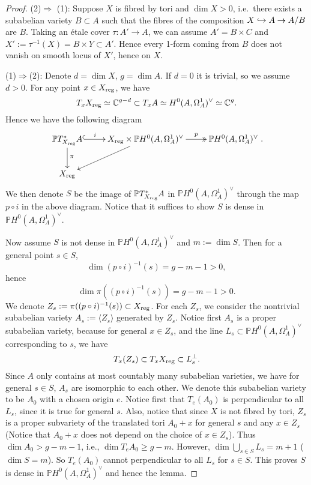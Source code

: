 \documentclass[a4paper,12pt,reqno]{amsart}
\theoremstyle{plain}
\theoremstyle{remark}
\newcommand{\C}{\mathbb C}
\renewcommand{\cong}{\simeq}
\newcommand{\into}{\hookrightarrow}
\newcommand{\onto}{\rightarrow\hspace*{-.14in}\rightarrow}
\begin{document}
\begin{proof}\label{proof:van-nonsimple} (2)$\Rightarrow$ (1): Suppose $X$ is fibred by tori and $\dim X>0$, i.e.\ there exists a subabelian variety $B\subset A$ such that the fibres of the composition 
$X\into A \onto A/B$ are $B$. Taking an \'etale cover $\tau: A'\to A$, we can assume $A'=B\times C$ and $X':=\tau^{-1}(X)=B\times Y\subset A'$. Hence every 1-form coming from $B$ does not vanish on smooth locus of $X'$, hence on $X$. 

(1)$\Rightarrow$(2): Denote $d=\dim X$, $g=\dim A$. If $d=0$ it is trivial, so we assume $d>0$. For any point $x\in X_{\textnormal{reg}}$, we have $$T_xX_{\textnormal{reg}}\cong \C^{g-d}\subset T_xA\cong H^0(A, \Omega_A^1)^{\vee}\cong \C^g.$$
Hence we have the following diagram 
$$\xymatrix{
\mathbb{P}T^*_{X_{\textnormal{reg}}}A \ar[d]^{\pi} \ar@{^{(}->}[r]^-i
&X_{\textnormal{reg}}\times \mathbb{P}H^0(A, \Omega_A^1)^{\vee}\ar[dl] \ar@{->>}[r]^-p&\mathbb{P}H^0(A, \Omega_A^1)^{\vee} \\
X_{\textnormal{reg}}
}.$$
We then denote $S$ be the image of $\mathbb{P}T^*_{X_{\textnormal{reg}}}A$ in $\mathbb{P}H^0(A, \Omega_A^1)^{\vee}$ through the map $p\circ i$ in the above diagram. Notice that it suffices to show $S$ is dense in $\mathbb{P}H^0(A, \Omega_A^1)^{\vee}$. 

Now assume $S$ is not dense in $\mathbb{P}H^0(A, \Omega_A^1)^{\vee}$ and $m:=\dim S$. Then for a general point $s\in S$, $$\dim (p\circ i)^{-1}(s)=g-m-1>0,$$ hence $$\dim \pi((p\circ i)^{-1}(s))=g-m-1>0.$$ We denote $Z_s:= \pi((p\circ i)^{-1}(s))\subset X_{\textnormal{reg}}$. For each $Z_s$, we consider the nontrivial subabelian variety $A_s:=\langle Z_s \rangle$ generated by $Z_s$.  Notice first $A_s$ is a proper subabelian variety, because for general $x\in Z_s$, and the line $L_s\subset \mathbb{P}H^0(A, \Omega_A^1)^{\vee}$ corresponding to $s$, we have $$T_x(Z_s)\subset T_xX_{\textnormal{reg}}\subset L_s^{\perp}.$$
Since $A$ only contains at most countably many subabelian varieties, we have for general $s\in S$, $A_s$ are isomorphic to each other.  We denote this subabelian variety to be $A_0$ with a chosen origin $e$. Notice first that $T_e(A_0)$ is perpendicular to all $L_s$, since it is true for general $s$. Also, notice that since $X$ is not fibred by tori, $Z_s$ is a proper subvariety of the translated tori $A_0+x$ for general $s$ and any $x\in Z_s$ (Notice that $A_0+x$ does not depend on the choice of $x\in Z_s$). Thus $\dim A_0>g-m-1$, i.e., $\dim T_eA_0\geq g-m$. However, $\dim \bigcup_{s\in S}L_s=m+1$ ($\dim S=m$). So $T_e(A_0)$ cannot perpendicular to all $L_s$ for $s\in S$. This proves $S$ is dense in $\mathbb{P}H^0(A, \Omega_A^1)^{\vee}$ and hence the lemma.
\end{proof}
\end{document}
